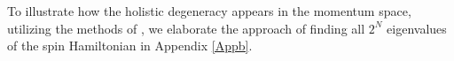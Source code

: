 \documentclass[twocolumn,floats,superscriptaddress]{revtex4}
\begin{document}
 {To illustrate how the holistic degeneracy appears {in the momentum space}, utilizing the methods of \cite{Sun2009}, we elaborate the approach of finding all $2^N$ eigenvalues of the spin Hamiltonian in Appendix \ref{Appb}.}

\end{document}
